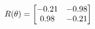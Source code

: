 \documentclass[preview]{standalone}
\begin{document}
\begin{align*}
\special{dvisvgm:raw <g id='unique000'>}R(\theta) = \begin{bmatrix}-0.21 & -0.98\\0.98 & -0.21\end{bmatrix}\special{dvisvgm:raw </g>}
\end{align*}
\end{document}
